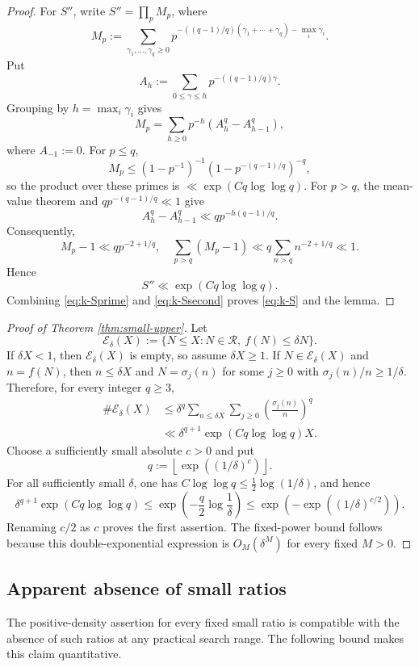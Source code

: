 \documentclass[11pt,letterpaper,reqno]{amsart}
\numberwithin{equation}{section}
\theoremstyle{remark}
\newcommand{\Rcal}{\mathcal{R}}
\renewcommand{\leq}{\leqslant}
\renewcommand{\geq}{\geqslant}
\begin{document}
\begin{proof}
For $S''$, write $S''=\prod_pM_p$, where
\[
 M_p:=\sum_{\gamma_1,\ldots,\gamma_q\geq0}
 p^{-((q-1)/q)(\gamma_1+\cdots+\gamma_q)-\max_i\gamma_i}.
\]
Put
\[
 A_h:=\sum_{0\leq\gamma\leq h}p^{-((q-1)/q)\gamma}.
\]
Grouping by $h=\max_i\gamma_i$ gives
\[
 M_p=\sum_{h\geq0}p^{-h}(A_h^q-A_{h-1}^q),
\]
where $A_{-1}:=0$.
For $p\leq q$,
\[
 M_p\leq(1-p^{-1})^{-1}(1-p^{-(q-1)/q})^{-q},
\]
so the product over these primes is $\ll\exp(Cq\log\log q)$. For $p>q$,
the mean-value theorem and $qp^{-(q-1)/q}\ll1$ give
\[
 A_h^q-A_{h-1}^q\ll q p^{-h(q-1)/q}.
\]
Consequently,
\[
 M_p-1\ll q p^{-2+1/q},
\quad
 \sum_{p>q}(M_p-1)\ll q\sum_{n>q}n^{-2+1/q}\ll1.
\]
Hence
\begin{equation}\label{eq:k-Ssecond}
 S''\ll\exp(Cq\log\log q).
\end{equation}
Combining \eqref{eq:k-Sprime} and \eqref{eq:k-Ssecond} proves
\eqref{eq:k-S} and the lemma.
\end{proof}

\begin{proof}[Proof of Theorem \ref{thm:small-upper}]
Let
\[
 \mathcal{E}_\delta(X):=
 \{N\leq X:N\in\Rcal,\ f(N)\leq\delta N\}.
\]
If $\delta X<1$, then $\mathcal{E}_\delta(X)$ is empty, so assume
$\delta X\geq1$. If $N\in\mathcal{E}_\delta(X)$ and $n=f(N)$, then
$n\leq\delta X$ and $N=\sigma_j(n)$ for some $j\geq0$ with
$\sigma_j(n)/n\geq1/\delta$. Therefore, for every integer $q\geq3$,
\begin{align*}
 \#\mathcal{E}_\delta(X)
 &\leq\delta^q\sum_{n\leq\delta X}\sum_{j\geq0}
 \left(\frac{\sigma_j(n)}n\right)^q\\
 &\ll\delta^{q+1}\exp(Cq\log\log q)X.
\end{align*}
Choose a sufficiently small absolute $c>0$ and put
\[
 q:=\left\lfloor\exp((1/\delta)^c)\right\rfloor.
\]
For all sufficiently small $\delta$, one has
$C\log\log q\leq\tfrac12\log(1/\delta)$, and hence
\[
 \delta^{q+1}\exp(Cq\log\log q)
 \leq\exp\!\left(-\frac q2\log\frac1\delta\right)
 \leq\exp\!\left(-\exp((1/\delta)^{c/2})\right).
\]
Renaming $c/2$ as $c$ proves the first assertion. The fixed-power bound
follows because this double-exponential expression is $O_M(\delta^M)$ for
every fixed $M>0$.
\end{proof}

\subsection{Apparent absence of small ratios}

The positive-density assertion for every fixed small ratio is compatible
with the absence of such ratios at any practical search range. The
following bound makes this claim quantitative.
\end{document}
